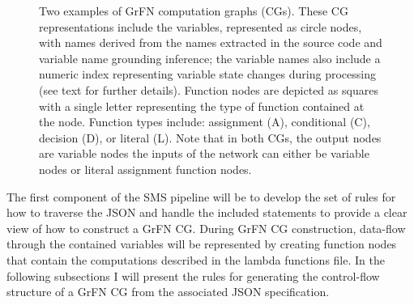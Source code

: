 \FloatBarrier
\begin{figure}[!tbp]
  \centering
  \hfill
  \caption[GrFN Computation Graph Examples]{Two examples of GrFN computation graphs (CGs). These CG representations include the variables, represented as circle nodes, with names derived from the names extracted in the source code and variable name grounding inference; the variable names also include a numeric index representing variable state changes during processing (see text for further details). Function nodes are depicted as squares with a single letter representing the type of function contained at the node. Function types include: assignment (A), conditional (C), decision (D), or literal (L). Note that in both CGs, the output nodes are variable nodes the inputs of the network can either be variable nodes or literal assignment function nodes.}
\end{figure}
\FloatBarrier

The first component of the SMS pipeline will be to develop the set of rules for how to traverse the JSON and handle the included statements to provide a clear view of how to construct a GrFN CG.
During GrFN CG construction, data-flow through the contained variables will be represented by creating function nodes that contain the computations described in the lambda functions file.
In the following subsections I will present the rules for generating the control-flow structure of a GrFN CG from the associated JSON specification.

